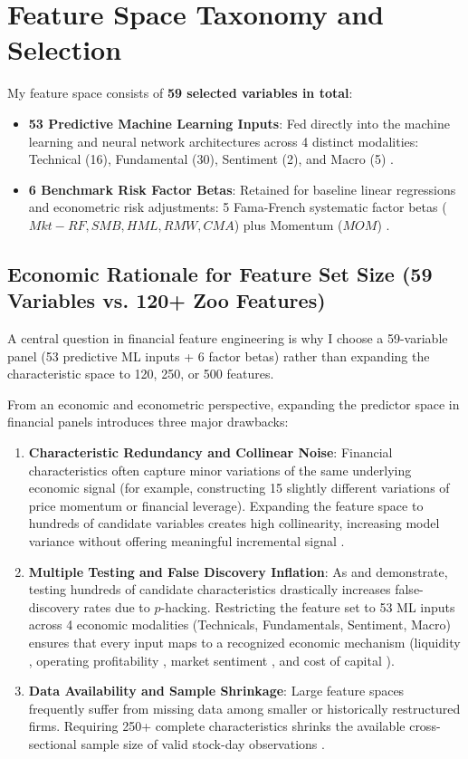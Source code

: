 \section{Feature Space Taxonomy and Selection}
My feature space consists of \textbf{59 selected variables in total}:
\begin{itemize}
    \item \textbf{53 Predictive Machine Learning Inputs}: Fed directly into the machine learning and neural network architectures across 4 distinct modalities: Technical (16), Fundamental (30), Sentiment (2), and Macro (5) \citep{gu2020empirical, cong2021textual}.
    \item \textbf{6 Benchmark Risk Factor Betas}: Retained for baseline linear regressions and econometric risk adjustments: 5 Fama-French systematic factor betas ($Mkt-RF, SMB, HML, RMW, CMA$) plus Momentum ($MOM$) \citep{fama2015five, carhart1997on}.
\end{itemize}

\subsection{Economic Rationale for Feature Set Size (59 Variables vs. 120+ Zoo Features)}
A central question in financial feature engineering is why I choose a 59-variable panel (53 predictive ML inputs + 6 factor betas) rather than expanding the characteristic space to 120, 250, or 500 features. 

From an economic and econometric perspective, expanding the predictor space in financial panels introduces three major drawbacks:
\begin{enumerate}
    \item \textbf{Characteristic Redundancy and Collinear Noise}: Financial characteristics often capture minor variations of the same underlying economic signal (for example, constructing 15 slightly different variations of price momentum or financial leverage). Expanding the feature space to hundreds of candidate variables creates high collinearity, increasing model variance without offering meaningful incremental signal \citep{freyberger2020dissecting, kozak2020shrinking}.
    \item \textbf{Multiple Testing and False Discovery Inflation}: As \citet{harvey2016and} and \citet{harvey2020false} demonstrate, testing hundreds of candidate characteristics drastically increases false-discovery rates due to $p$-hacking. Restricting the feature set to 53 ML inputs across 4 economic modalities (Technicals, Fundamentals, Sentiment, Macro) ensures that every input maps to a recognized economic mechanism (liquidity \citep{pastor2003liquidity}, operating profitability \citep{novy2013other}, market sentiment \citep{cong2021textual}, and cost of capital \citep{fama2015five}).
    \item \textbf{Data Availability and Sample Shrinkage}: Large feature spaces frequently suffer from missing data among smaller or historically restructured firms. Requiring 250+ complete characteristics shrinks the available cross-sectional sample size of valid stock-day observations \citep{avramov2023machine}.
\end{enumerate}

